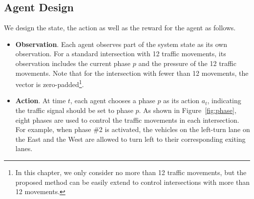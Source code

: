 \subsection{Agent Design}
We design the state, the action as well as the reward for the \PressLight agent as follows.

\begin{itemize}
    \item \textbf{Observation}. Each agent observes part of the system state as its own observation. For a standard intersection with 12 traffic movements, its observation includes the current phase $p$ and the pressure of the 12 traffic movements. Note that for the intersection with fewer than 12 movements, the vector is zero-padded\footnote{In this chapter, we only consider no more than 12 traffic movements, but the proposed method can be easily extend to control intersections with more than 12 movements.}.
    \item \textbf{Action}. 
         At time $t$, each agent chooses a phase $p$ as its action $a_t$, indicating the traffic signal should be set to phase $p$. 
         As shown in Figure~\ref{fig:phase}, eight phases are used to control the traffic movements in each intersection. For example, when phase \#2 is activated, the vehicles on the left-turn lane on the East and the West are allowed to turn left to their corresponding exiting lanes.
         
         






\end{itemize}
